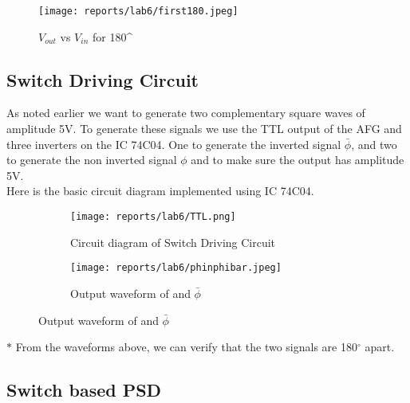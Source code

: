 \documentclass[12pt]{article}
\begin{document}
        \begin{figure}[H]
            \centering
            \texttt{[image: reports/lab6/first180.jpeg]}
            \caption{$V_{out}$ vs $V_{in}$ for 180^{\circ}}
        \end{figure}
    \newpage
    \subsection{Switch Driving Circuit}
        As noted earlier we want to generate two complementary square waves of amplitude 5V.
        To generate these signals we use the TTL output of the AFG and three inverters on the IC 74C04. One to generate the inverted signal \(\bar \phi\), and two to generate the non inverted signal \(\phi\) and to make sure the output has amplitude 5V.\\
        Here is the basic circuit diagram implemented using IC 74C04.
        \begin{figure}[H]
            \centering
            \begin{subfigure}{.5\textwidth}
                \centering
                \texttt{[image: reports/lab6/TTL.png]}
                \caption{Circuit diagram of Switch Driving Circuit}
            \end{subfigure}%
            \begin{subfigure}{.5\textwidth}
                \centering
                \texttt{[image: reports/lab6/phinphibar.jpeg]}
                \caption{Output waveform of \phi and \(\bar \phi\)}
            \end{subfigure}%
        \end{figure}
        \noindent
        $\ast$ From the waveforms above, we can verify that the two signals are 180$^{\circ}$ apart.
        
    \subsection{Switch based PSD}
    
\end{document}
